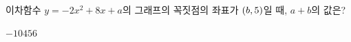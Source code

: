 이차함수 $y=-2x^2+8x+a$의 그래프의 꼭짓점의 좌표가 $(b{,}\mkern3mu 5)$일 때, $a+b$의 값은? 
\begin{choices32}{$-1$}{$0$}{$4$}{$5$}{$6$}\end{choices32}
